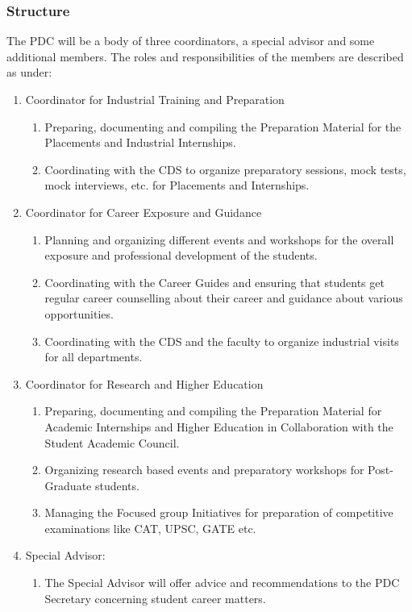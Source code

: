 \documentclass[12pt]{article}
\begin{document}
\subsubsection{Structure}
The PDC will be a body of three coordinators, a special advisor and some additional members. The roles and responsibilities of the members are described as under: 
\begin{enumerate}
    \item Coordinator for Industrial Training and Preparation
    \begin{enumerate}
        \item Preparing, documenting and compiling the Preparation Material for the Placements and Industrial Internships.
        \item Coordinating with the CDS to organize preparatory sessions, mock tests, mock interviews, etc. for Placements and Internships.
    \end{enumerate}
    \item Coordinator for Career Exposure and Guidance
    \begin{enumerate}
        \item Planning and organizing different events and workshops for the overall exposure and professional development of the students.
        \item Coordinating with the Career Guides and ensuring that students get regular career counselling about their career and guidance about various opportunities.
        \item Coordinating with the CDS and the faculty to organize industrial visits for all departments.
    \end{enumerate}
    \item Coordinator for Research and Higher Education
    \begin{enumerate}
        \item Preparing, documenting and compiling the Preparation Material for Academic Internships and Higher Education in Collaboration with the Student Academic Council.
        \item Organizing research based events and  preparatory workshops for Post-Graduate students.
        \item Managing the Focused group Initiatives for preparation of competitive examinations like CAT, UPSC, GATE etc.
    \end{enumerate}
    \item Special Advisor:
    \begin{enumerate}
        \item The Special Advisor will offer advice and recommendations to the PDC Secretary concerning student career matters.

\end{enumerate}
\end{enumerate}
\end{document}

